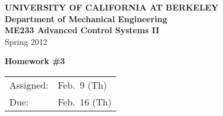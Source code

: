 \documentclass[letterpaper,12pt]{article}
\begin{document}
\begin{center}
    {\bf UNIVERSITY OF CALIFORNIA AT BERKELEY}\\
    {\bf Department of Mechanical Engineering}\\
    {\bf ME233  Advanced Control Systems II}\\
    Spring 2012\\
\end{center}
\noindent
{\Large \bf Homework \#3 }\\[-3em]
\begin{flushright}
\begin{tabular} {l l}
    Assigned: &  Feb.\ 9 (Th) \\
    Due: & Feb.\ 16 (Th)
\end{tabular}
\end{flushright}

\begin{enumerate}





\end{enumerate}
\end{document}
